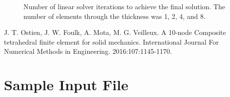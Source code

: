 \documentclass[a4paper, 12pt]{article}
\begin{document}
\begin{figure}[H]
  \centering
  \caption{Number of linear solver iterations to achieve the final solution.
           The number of elements through the thickness was 1, 2, 4, and 8.}
  \label{fig:iterations}
\end{figure}


\newpage
\begin{thebibliography}{99}

J. T. Ostien,
J. W. Foulk,
A. Mota,
M. G. Veilleux.
A 10-node Composite tetrahedral finite element for solid mechanics.
International Journal For Numerical Methods in Engineering.
2016:107:1145-1170. 

\end{thebibliography}

\newpage
\appendix
\section{Sample Input File} \label{app_input_file}

\end{document}
